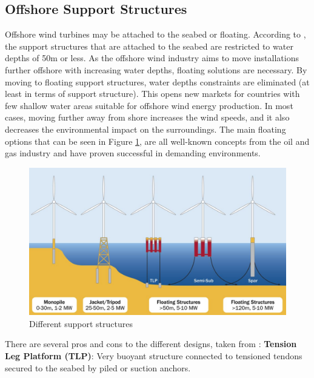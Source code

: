 \subsection{Offshore Support Structures}
Offshore wind turbines may be attached to the seabed or floating. According to \cite{IRENA2016}, the support structures that are attached to the seabed are restricted to water depths of 50m or less. As the offshore wind industry aims to move installations further offshore with increasing water depths, floating solutions are necessary. By moving to floating support structures, water depths constraints are eliminated (at least in terms of support structure). This opens new markets for countries with few shallow water areas suitable for offshore wind energy production. In most cases, moving further away from shore increases the wind speeds, and it also decreases the environmental impact on the surroundings. The main floating options that can be seen in Figure \ref{fig:supstruc}, are all well-known concepts from the oil and gas industry and have proven successful in demanding environments. 

\begin{figure}[H]
\centering
\includegraphics[scale=0.6]{figures/supstruc}
\caption[$\; \:$Different support structures]{Different support structures \cite{Bailey2014}}
 \label{fig:supstruc}
\end{figure}

\noindent There are several pros and cons to the different designs, taken from \cite{IRENA2016}: \newline
\newline
\textbf{Tension Leg Platform (TLP)}: Very buoyant structure connected to tensioned tendons secured to the seabed by piled or suction anchors.

